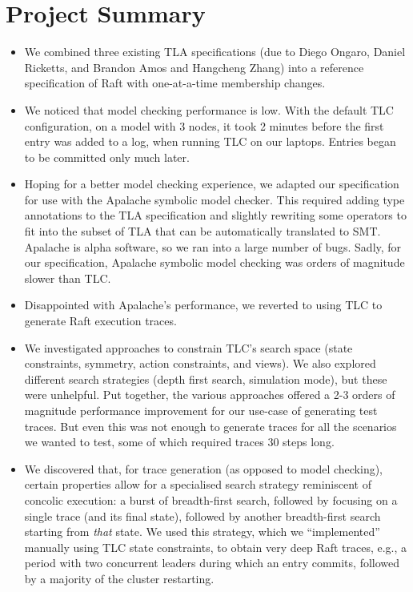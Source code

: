 \documentclass[a4paper]{article}
\makeatletter
\newcommand*{\eg}{e.g.\@\xspace}
\makeatother
\begin{document}
\section{Project Summary}

\begin{itemize}
    \item We combined three existing TLA specifications (due to Diego Ongaro, Daniel Ricketts, and Brandon Amos and Hangcheng Zhang) into a reference specification of Raft with one-at-a-time membership changes.

    \item We noticed that model checking performance is low.
    With the default TLC configuration, on a model with 3 nodes, it took 2 minutes before the first entry was added to a log, when running TLC on our laptops.
    Entries began to be committed only much later.

    \item Hoping for a better model checking experience, we adapted our specification for use with the Apalache symbolic model checker.
    This required adding type annotations to the TLA specification and slightly rewriting some operators to fit into the subset of TLA that can be automatically translated to SMT.
    Apalache is alpha software, so we ran into a large number of bugs.
    Sadly, for our specification, Apalache symbolic model checking was orders of magnitude slower than TLC.

    \item Disappointed with Apalache's performance, we reverted to using TLC to generate Raft execution traces.
    
    \item We investigated approaches to constrain TLC's search space (state constraints, symmetry, action constraints, and views).
    We also explored different search strategies (depth first search, simulation mode), but these were unhelpful.
    Put together, the various approaches offered a 2-3 orders of magnitude performance improvement for our use-case of generating test traces.
    But even this was not enough to generate traces for all the scenarios we wanted to test, some of which required traces 30 steps long.

    \item We discovered that, for trace generation (as opposed to model checking), certain properties allow for a specialised search strategy reminiscent of concolic execution: a burst of breadth-first search, followed by focusing on a single trace (and its final state), followed by another breadth-first search starting from \emph{that} state.
    We used this strategy, which we ``implemented'' manually using TLC state constraints, to obtain very deep Raft traces, \eg, a period with two concurrent leaders during which an entry commits, followed by a majority of the cluster restarting.


\end{itemize}
\end{document}
